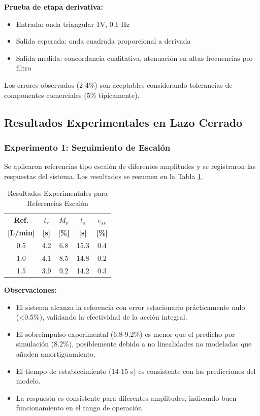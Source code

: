 \documentclass[conference]{IEEEtran}
\begin{document}
\textbf{Prueba de etapa derivativa:}
\begin{itemize}
\item Entrada: onda triangular 1V, 0.1 Hz
\item Salida esperada: onda cuadrada proporcional a derivada
\item Salida medida: concordancia cualitativa, atenuación en altas frecuencias por filtro
\end{itemize}

Los errores observados (2-4\%) son aceptables considerando tolerancias de componentes comerciales (5\% típicamente).

\subsection{Resultados Experimentales en Lazo Cerrado}

\subsubsection{Experimento 1: Seguimiento de Escalón}

Se aplicaron referencias tipo escalón de diferentes amplitudes y se registraron las respuestas del sistema. Los resultados se resumen en la Tabla \ref{tab:resultados_escalon}.

\begin{table}[htbp]
\centering
\caption{Resultados Experimentales para Referencias Escalón}
\label{tab:resultados_escalon}
\footnotesize
\begin{tabular}{ccccc}
\toprule
\textbf{Ref.} & $t_r$ & $M_p$ & $t_s$ & $e_{ss}$ \\
\textbf{[L/min]} & \textbf{[s]} & \textbf{[\%]} & \textbf{[s]} & \textbf{[\%]} \\
\midrule
0.5 & 4.2 & 6.8 & 15.3 & 0.4 \\
1.0 & 4.1 & 8.5 & 14.8 & 0.2 \\
1.5 & 3.9 & 9.2 & 14.2 & 0.3 \\
\bottomrule
\end{tabular}
\end{table}

\textbf{Observaciones:}
\begin{itemize}
\item El sistema alcanza la referencia con error estacionario prácticamente nulo (<0.5\%), validando la efectividad de la acción integral.
\item El sobreimpulso experimental (6.8-9.2\%) es menor que el predicho por simulación (8.2\%), posiblemente debido a no linealidades no modeladas que añaden amortiguamiento.
\item El tiempo de establecimiento (14-15 s) es consistente con las predicciones del modelo.
\item La respuesta es consistente para diferentes amplitudes, indicando buen funcionamiento en el rango de operación.
\end{itemize}
\end{document}

